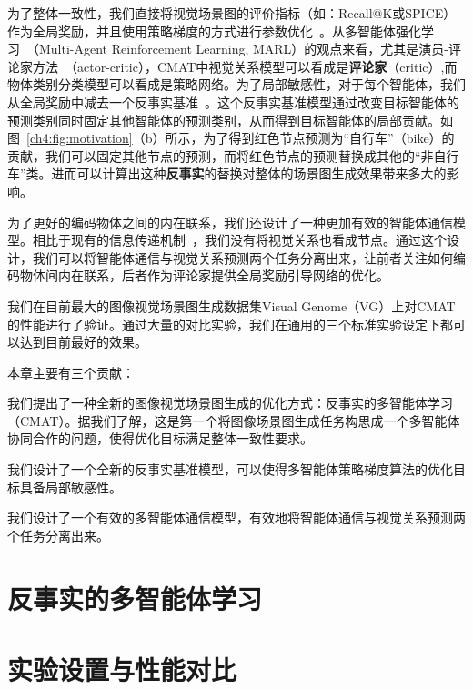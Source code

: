 为了整体一致性，我们直接将视觉场景图的评价指标（如：Recall@K或SPICE）作为全局奖励，并且使用策略梯度的方式进行参数优化~\cite{sutton2000policy}。从多智能体强化学习~\cite{tampuu2017multiagent,lowe2017multi}（Multi-Agent Reinforcement Learning, MARL）的观点来看，尤其是演员-评论家方法~\cite{lowe2017multi}（actor-critic），CMAT中视觉关系模型可以看成是\textbf{评论家}（critic）,而物体类别分类模型可以看成是策略网络。为了局部敏感性，对于每个智能体，我们从全局奖励中减去一个反事实基准~\cite{foerster2018counterfactual}。这个反事实基准模型通过改变目标智能体的预测类别同时固定其他智能体的预测类别，从而得到目标智能体的局部贡献。如图~\ref{ch4:fig:motivation}（b）所示，为了得到红色节点预测为“自行车”（bike）的贡献，我们可以固定其他节点的预测，而将红色节点的预测替换成其他的“非自行车”类。进而可以计算出这种\textbf{反事实}的替换对整体的场景图生成效果带来多大的影响。

为了更好的编码物体之间的内在联系，我们还设计了一种更加有效的智能体通信模型。相比于现有的信息传递机制~\cite{xu2017scene, li2017scene, jae2018tensorize, li2017vip, yin2018zoom, li2018factorizable}，我们没有将视觉关系也看成节点。通过这个设计，我们可以将智能体通信与视觉关系预测两个任务分离出来，让前者关注如何编码物体间内在联系，后者作为评论家提供全局奖励引导网络的优化。

我们在目前最大的图像视觉场景图生成数据集Visual Genome（VG）上对CMAT的性能进行了验证。通过大量的对比实验，我们在通用的三个标准实验设定下都可以达到目前最好的效果。

本章主要有三个贡献：
\begin{asparaenum}

\item 我们提出了一种全新的图像视觉场景图生成的优化方式：反事实的多智能体学习（CMAT）。据我们了解，这是第一个将图像场景图生成任务构思成一个多智能体协同合作的问题，使得优化目标满足整体一致性要求。

\item 我们设计了一个全新的反事实基准模型，可以使得多智能体策略梯度算法的优化目标具备局部敏感性。

\item 我们设计了一个有效的多智能体通信模型，有效地将智能体通信与视觉关系预测两个任务分离出来。

\end{asparaenum}


\section{反事实的多智能体学习}

\section{实验设置与性能对比}
